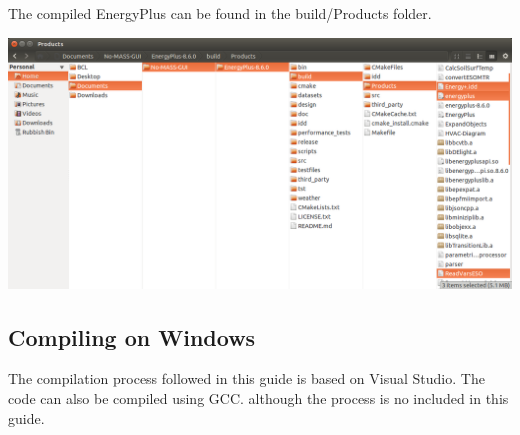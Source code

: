 \begin{DoxyEnumerate}
\item The compiled Energy\+Plus can be found in the {\ttfamily build/\+Products} folder. 
\begin{DoxyImage}
\includegraphics[width=15cm]{EPlus_exeFolder.png}
\end{DoxyImage}
  
\end{DoxyEnumerate}



 

\subsection*{Compiling on Windows}



The compilation process followed in this guide is based on Visual Studio. The code can also be compiled using G\+CC. although the process is no included in this guide.



